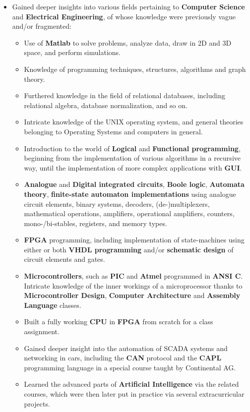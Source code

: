 \documentclass[11pt,a4paper,sans]{moderncv}
\begin{document}
	\begin{itemize}
	\item	Gained deeper insights into various fields pertaining to \textbf{Computer Science} and \textbf{Electrical Engineering}, of whose knowledge were previously vague and/or fragmented:
		\begin{itemize}
		\item	Use of \textbf{Matlab} to solve problems, analyze data, draw in 2D and 3D space, and perform simulations.
		\item	Knowledge of programming techniques, structures, algorithms and graph theory.
		\item	Furthered knowledge in the field of relational databases, including relational algebra, database normalization, and so on.
		\item	Intricate knowledge of the UNIX operating system, and general theories belonging to Operating Systems and computers in general.
		\item	Introduction to the world of \textbf{Logical} and \textbf{Functional programming}, beginning from the implementation of various algorithms in a recursive way, until the implementation of more complex applications with \textbf{GUI}.
		\item	\textbf{Analogue} and \textbf{Digital integrated circuits}, \textbf{Boole logic}, \textbf{Automata theory}, \textbf{finite-state automaton implementations} using analogue circuit elements, binary systems, decoders, (de-)multiplexers, mathematical operations, amplifiers, operational amplifiers, counters, mono-/bi-stables, registers, and memory types.
		\item	\textbf{FPGA} programming, including implementation of state-machines using either or both \textbf{VHDL programming} and/or \textbf{schematic design} of circuit elements and gates.
		\item	\textbf{Microcontrollers}, such as \textbf{PIC} and \textbf{Atmel} programmed in \textbf{ANSI C}. Intricate knowledge of the inner workings of a microprocessor thanks to \textbf{Microcontroller Design}, \textbf{Computer Architecture} and \textbf{Assembly Language} classes.
		\item	Built a fully working \textbf{CPU} in \textbf{FPGA} from scratch for a class assignment.
		\item	Gained deeper insight into the automation of SCADA systems and networking in cars, including the \textbf{CAN} protocol and the \textbf{CAPL} programming language in a special course taught by Continental AG.
		\item	Learned the advanced parts of \textbf{Artificial Intelligence} via the related courses, which were then later put in practice via several extracurricular projects.

\end{itemize}
\end{itemize}
\end{document}
